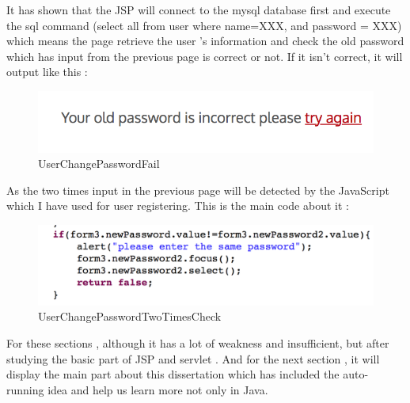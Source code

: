 \documentclass[12pt]{article}
\begin{document}
 	It has shown that the JSP will connect to the mysql database first and execute the sql command (select  all from user where name=XXX, and password = XXX)  which means the page retrieve the user 's information and check the old password which has input from the previous page is correct or not. If it isn't correct, it will output like this :
\begin{figure}[H]
	\centering	
\includegraphics[width=15cm]{images/UserChangePasswordFail.jpg}

	
	\caption[UserChangePasswordFail]{UserChangePasswordFail}
	\label{UserChangePasswordFail}
\end{figure}
As the two times input in the previous page will be detected by the JavaScript which I have used for user registering. This is the main code about it :

\begin{figure}[H]
	\centering	
\includegraphics[width=15cm]{images/UserChangePasswordTwoTimesCheck.jpg}

	
	\caption[UserChangePasswordTwoTimesCheck]{UserChangePasswordTwoTimesCheck}
	\label{UserChangePasswordTwoTimesCheck}
\end{figure}
For these sections , although it has a lot of weakness and insufficient, but after studying the basic part of JSP and servlet . And for the next section , it will display the main part about this dissertation which has included the auto-running idea and help us learn more not only in Java.
\cleardoublepage
\end{document}
